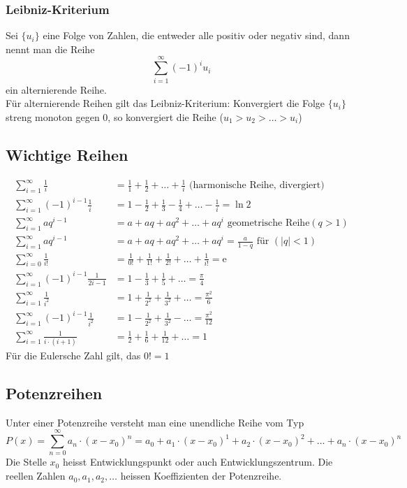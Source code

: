 \subsubsection{Leibniz-Kriterium}
Sei $\{u_i\}$ eine Folge von Zahlen, die entweder alle positiv oder negativ sind,
dann nennt man die Reihe
\begin{equation*}
	\sum_{i=1}^{\infty} (-1)^i u_i	
\end{equation*}
ein alternierende Reihe.\\

Für alternierende Reihen gilt das Leibniz-Kriterium: Konvergiert die Folge $\{u_i\}$ streng monoton gegen 0,
so konvergiert die Reihe ($u_1 > u_2 > \dots > u_i$)

\subsection{Wichtige Reihen}

\begin{align*}
	\sum_{i=1}^{\infty} \frac{1}{i}& = \frac{1}{1} + \frac{1}{2} + \dots + \frac{1}{i} \mbox{ (harmonische Reihe, divergiert)}\\
	\sum_{i=1}^{\infty} (-1)^{i-1}\frac{1}{i} & = 1 - \frac{1}{2} + \frac{1}{3} - \frac{1}{4} + \dots - \frac{1}{i} = \ln 2\\
	\sum_{i=1}^{\infty} a q^{i-1}& = a + aq + aq^2 + \dots + aq^i \mbox{ geometrische Reihe} (q > 1)\\
	\sum_{i=1}^{\infty} a q^{i-1}& = a + aq + aq^2 + \dots + aq^i = \frac{a}{1 - q} \mbox{ für } (|q| < 1) \\
	\sum_{i=0}^{\infty} \frac{1}{i!}& = \frac{1}{0!} + \frac{1}{1!} + \frac{1}{2!} + \dots + \frac{1}{i!} = \mathrm e \\
	\sum_{i=1}^{\infty} (-1)^{i-1}\frac{1}{2i - 1}& = 1 - \frac{1}{3} + \frac{1}{5} + \dots = \frac{\pi}{4}\\
	\sum_{i=1}^{\infty} \frac{1}{i^2}& = 1 + \frac{1}{2^2} + \frac{1}{3^2} + \dots  = \frac{\pi^2}{6}\\
	\sum_{i=1}^{\infty} (-1)^{i-1}\frac{1}{i^2}& = 1 - \frac{1}{2^2} + \frac{1}{3^2} - \dots = \frac{\pi^2}{12}\\	
	\sum_{i=1}^{\infty} \frac{1}{i \cdot (i + 1)}& = \frac{1}{2} + \frac{1}{6} + \frac{1}{12} + \dots = 1	
\end{align*}
Für die Eulersche Zahl gilt, das $0! = 1$

\subsection{Potenzreihen}
Unter einer Potenzreihe versteht man eine unendliche Reihe vom Typ
\begin{equation*}
	P(x) = \sum_{n=0}^{\infty} a_n \cdot (x - x_0)^n = a_0 + a_1 \cdot (x - x_0)^1 + a_2 \cdot (x - x_0)^2 + \dots + a_n \cdot (x - x_0)^n
\end{equation*}
Die Stelle $x_0$ heisst Entwicklungspunkt oder auch Entwicklungszentrum.
Die reellen Zahlen $a_0, a_1, a_2, \dots$ heissen Koeffizienten der Potenzreihe.

